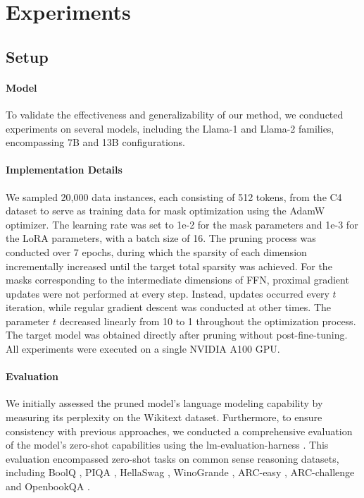 \section{Experiments}

\subsection{Setup}

\paragraph{Model}

To validate the effectiveness and generalizability of our method, we conducted experiments on several models, including the Llama-1 \cite{touvron2023llama} and Llama-2 \cite{touvron2023llama2} families, encompassing 7B and 13B configurations.

\paragraph{Implementation Details}

We sampled 20,000 data instances, each consisting of 512 tokens, from the C4 dataset \cite{raffel2020exploring} to serve as training data for mask optimization using the AdamW optimizer. The learning rate was set to 1e-2 for the mask parameters and 1e-3 for the LoRA parameters, with a batch size of 16. The pruning process was conducted over 7 epochs, during which the sparsity of each dimension incrementally increased until the target total sparsity was achieved. For the masks corresponding to the intermediate dimensions of FFN, proximal gradient updates were not performed at every step. Instead, updates occurred every $t$ iteration, while regular gradient descent was conducted at other times. The parameter $t$ decreased linearly from 10 to 1 throughout the optimization process. The target model was obtained directly after pruning without post-fine-tuning. All experiments were executed on a single NVIDIA A100 GPU.

\paragraph{Evaluation}

We initially assessed the pruned model's language modeling capability by measuring its perplexity on the Wikitext \cite{merity2016pointer} dataset. Furthermore, to ensure consistency with previous approaches, we conducted a comprehensive evaluation of the model's zero-shot capabilities using the lm-evaluation-harness \cite{eval-harness}. This evaluation encompassed zero-shot tasks on common sense reasoning datasets, including BoolQ \cite{clark2019boolq}, PIQA \cite{bisk2020piqa}, HellaSwag \cite{zellers2019hellaswag}, WinoGrande \cite{sakaguchi2020winogrande}, ARC-easy \cite{clark2018think}, ARC-challenge \cite{clark2018think} and OpenbookQA \cite{mihaylov2018can}.

